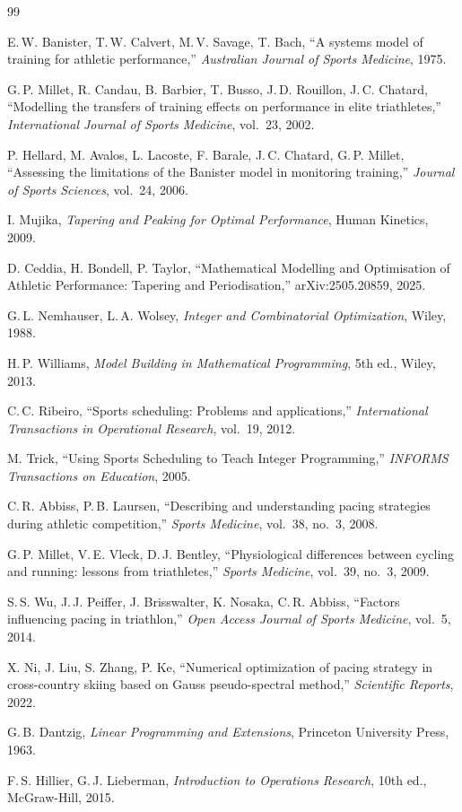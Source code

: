 \documentclass[11pt,a4paper]{article}
\begin{document}
\begin{thebibliography}{99}\footnotesize\setlength{\itemsep}{1pt}

 E.\,W. Banister, T.\,W. Calvert, M.\,V. Savage, T. Bach,
``A systems model of training for athletic performance,''
\emph{Australian Journal of Sports Medicine}, 1975.

 G.\,P. Millet, R. Candau, B. Barbier, T. Busso,
J.\,D. Rouillon, J.\,C. Chatard,
``Modelling the transfers of training effects on performance in elite triathletes,''
\emph{International Journal of Sports Medicine}, vol.~23, 2002.

 P. Hellard, M. Avalos, L. Lacoste, F. Barale, J.\,C. Chatard,
G.\,P. Millet, ``Assessing the limitations of the Banister model in monitoring
training,'' \emph{Journal of Sports Sciences}, vol.~24, 2006.

 I. Mujika, \emph{Tapering and Peaking for Optimal
Performance}, Human Kinetics, 2009.

 D. Ceddia, H. Bondell, P. Taylor, ``Mathematical Modelling
and Optimisation of Athletic Performance: Tapering and Periodisation,''
arXiv:2505.20859, 2025.

 G.\,L. Nemhauser, L.\,A. Wolsey, \emph{Integer and
Combinatorial Optimization}, Wiley, 1988.

 H.\,P. Williams, \emph{Model Building in Mathematical
Programming}, 5th ed., Wiley, 2013.

 C.\,C. Ribeiro, ``Sports scheduling: Problems and
applications,'' \emph{International Transactions in Operational Research},
vol.~19, 2012.

 M. Trick, ``Using Sports Scheduling to Teach Integer
Programming,'' \emph{INFORMS Transactions on Education}, 2005.

 C.\,R. Abbiss, P.\,B. Laursen, ``Describing and understanding
pacing strategies during athletic competition,'' \emph{Sports Medicine},
vol.~38, no.~3, 2008.

 G.\,P. Millet, V.\,E. Vleck, D.\,J. Bentley, ``Physiological
differences between cycling and running: lessons from triathletes,''
\emph{Sports Medicine}, vol.~39, no.~3, 2009.

 S.\,S. Wu, J.\,J. Peiffer, J. Brisswalter, K. Nosaka,
C.\,R. Abbiss, ``Factors influencing pacing in triathlon,''
\emph{Open Access Journal of Sports Medicine}, vol.~5, 2014.

 X. Ni, J. Liu, S. Zhang, P. Ke, ``Numerical optimization of
pacing strategy in cross-country skiing based on Gauss pseudo-spectral method,''
\emph{Scientific Reports}, 2022.

 G.\,B. Dantzig, \emph{Linear Programming and Extensions},
Princeton University Press, 1963.

 F.\,S. Hillier, G.\,J. Lieberman, \emph{Introduction to
Operations Research}, 10th ed., McGraw-Hill, 2015.

\end{thebibliography}
\end{document}
